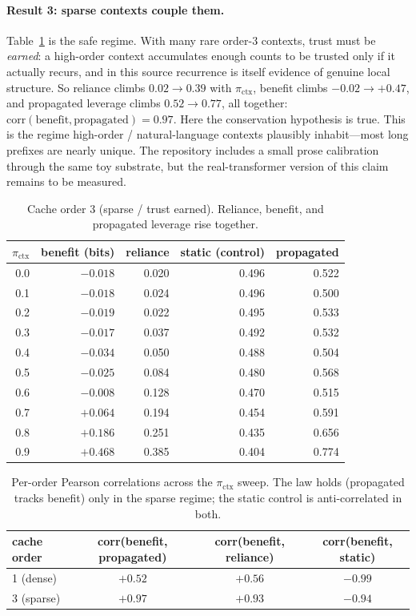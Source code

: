 \documentclass[11pt]{article}
\theoremstyle{plain}
\theoremstyle{definition}
\theoremstyle{remark}
\newcommand{\pictx}{\pi_{\text{ctx}}}
\begin{document}
\paragraph{Result 3: sparse contexts couple them.}
Table~\ref{tab:order3} is the safe regime. With many rare order-3 contexts, trust must be
\emph{earned}: a high-order context accumulates enough counts to be trusted only if it
actually recurs, and in this source recurrence is itself evidence of genuine local
structure. So reliance climbs $0.02\to0.39$ with $\pictx$, benefit climbs $-0.02\to+0.47$,
and propagated leverage climbs $0.52\to0.77$, all together:
$\mathrm{corr}(\text{benefit},\text{propagated})=0.97$. Here the conservation hypothesis is
true. This is the regime high-order / natural-language contexts plausibly inhabit---most long
prefixes are nearly unique. The repository includes a small prose calibration through the same
toy substrate, but the real-transformer version of this claim remains to be measured.

\begin{table}[t]
\centering\small
\caption{Cache order 3 (sparse / trust earned). Reliance, benefit, and propagated leverage
rise together.}
\label{tab:order3}
\begin{tabular}{rrrrr}
\toprule
$\pictx$ & benefit (bits) & reliance & static (control) & propagated \\
\midrule
0.0 & $-0.018$ & 0.020 & 0.496 & 0.522 \\
0.1 & $-0.018$ & 0.024 & 0.496 & 0.500 \\
0.2 & $-0.019$ & 0.022 & 0.495 & 0.533 \\
0.3 & $-0.017$ & 0.037 & 0.492 & 0.532 \\
0.4 & $-0.034$ & 0.050 & 0.488 & 0.504 \\
0.5 & $-0.025$ & 0.084 & 0.480 & 0.568 \\
0.6 & $-0.008$ & 0.128 & 0.470 & 0.515 \\
0.7 & $+0.064$ & 0.194 & 0.454 & 0.591 \\
0.8 & $+0.186$ & 0.251 & 0.435 & 0.656 \\
0.9 & $+0.468$ & 0.385 & 0.404 & 0.774 \\
\bottomrule
\end{tabular}
\end{table}

\begin{table}[t]
\centering\small
\caption{Per-order Pearson correlations across the $\pictx$ sweep. The law holds (propagated
tracks benefit) only in the sparse regime; the static control is anti-correlated in both.}
\label{tab:corr}
\begin{tabular}{lccc}
\toprule
cache order & corr(benefit, propagated) & corr(benefit, reliance) & corr(benefit, static) \\
\midrule
1 (dense)  & $+0.52$ & $+0.56$ & $-0.99$ \\
3 (sparse) & $+0.97$ & $+0.93$ & $-0.94$ \\
\bottomrule
\end{tabular}
\end{table}
\end{document}

